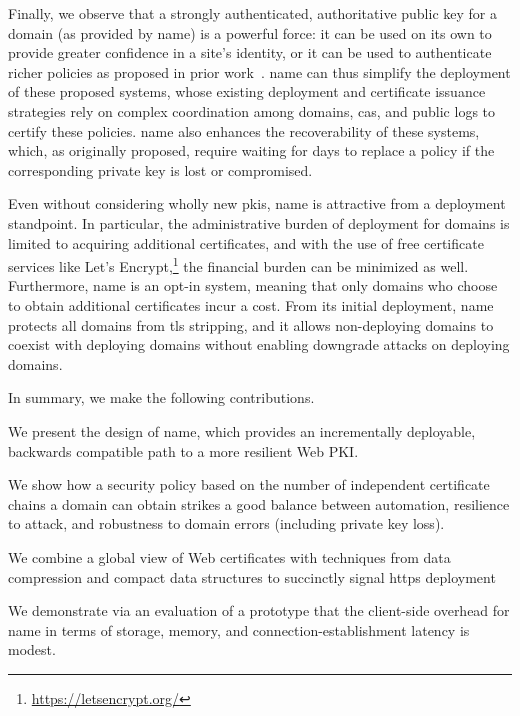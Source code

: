 Finally, we observe that a strongly authenticated, authoritative public key
for a domain (as provided by \ac{name}) is a powerful force: it can be used on its own to provide greater
confidence in a site's identity, or it can be used to authenticate richer
policies as proposed in prior work~\cite{basin2014arpki,
szalachowski2014policert}. \ac{name} can thus simplify the deployment of these
proposed systems, whose existing deployment and certificate issuance strategies
rely on complex coordination among domains, \acp{ca}, and public logs to certify
these policies. \ac{name} also enhances the recoverability of these systems,
which, as originally proposed, require waiting for days to replace a policy if
the corresponding private key is lost or compromised.

Even without considering wholly new \acp{pki}, \ac{name} is attractive from a
deployment standpoint. In particular, the administrative burden of deployment
for domains is limited to acquiring additional certificates, and with the use
of free certificate services like Let's
Encrypt,\footnote{\url{https://letsencrypt.org/}} the financial burden can be
minimized as well. Furthermore, \ac{name} is an opt-in system, meaning that only
domains who choose to obtain additional certificates incur a cost. From its
initial deployment, \ac{name} protects all domains from \ac{tls} stripping, and
it allows non-deploying domains to coexist with deploying domains without
enabling downgrade attacks on deploying domains.

In summary, we make the following contributions.
\begin{compactitem}
\item We present the design of \ac{name}, which provides an incrementally deployable,
      backwards compatible path to a more resilient Web PKI.
\item We show how a security policy based on the number of independent certificate chains
      a domain can obtain strikes a good balance between automation, 
      resilience to attack, and robustness to domain errors (including private key loss).
\item We combine a global view of Web certificates with techniques from data
      compression and compact data structures to succinctly signal \ac{https} deployment
\item We demonstrate via an evaluation of a prototype that the client-side overhead for
      \ac{name} in terms of storage, memory, and connection-establishment latency is
      modest. 
\end{compactitem}

